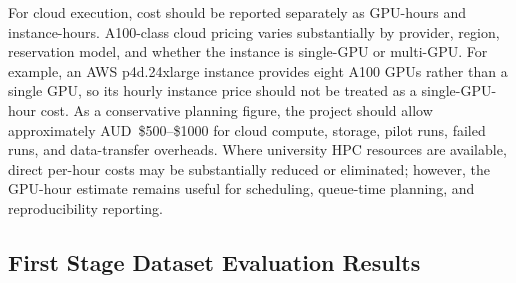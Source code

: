 For cloud execution, cost should be reported separately as GPU-hours and instance-hours. A100-class cloud pricing varies substantially by provider, region, reservation model, and whether the instance is single-GPU or multi-GPU. For example, an AWS p4d.24xlarge instance provides eight A100 GPUs rather than a single GPU, so its hourly instance price should not be treated as a single-GPU-hour cost. As a conservative planning figure, the project should allow approximately AUD~\$500--\$1000 for cloud compute, storage, pilot runs, failed runs, and data-transfer overheads. Where university HPC resources are available, direct per-hour costs may be substantially reduced or eliminated; however, the GPU-hour estimate remains useful for scheduling, queue-time planning, and reproducibility reporting.

\subsection{First Stage Dataset Evaluation Results}

